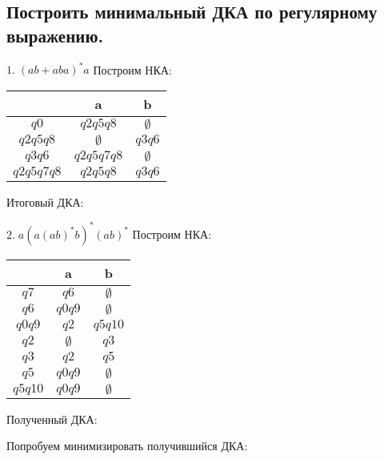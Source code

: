 \documentclass[a4paper,12pt]{article}
\begin{document}
\subsection*{Построить минимальный ДКА по регулярному выражению.}
\Large $1.\;(ab+aba)^*a$\newline
Построим НКА:
\begin{center}
\newline
\end{center}
\begin{center}
\begin{tabular}{ |c|c|c| } 
\hline
  & a & b \\ [0.5ex] 
 \hline
$q0$ & $q2q5q8$ & $\emptyset$ \\
$q2q5q8$ & $\emptyset$ & $q3q6$ \\
$q3q6$ & $q2q5q7q8$ & $\emptyset$ \\
$q2q5q7q8$ & $q2q5q8$ & $q3q6$ \\
 \hline
\end{tabular}
\end{center}
Итоговый ДКА:
\begin{center}
\newline
\end{center}
\Large $2.\;a(a(ab)^*b)^*(ab)^*$\newline
Построим НКА:
\begin{center}
\newline
\end{center}
\begin{center}
\begin{tabular}{ |c|c|c| } 
\hline
  & a & b \\ [0.5ex] 
 \hline
$q7$ & $q6$ & $\emptyset$ \\
$q6$ & $q0q9$ & $\emptyset$ \\
$q0q9$ & $q2$ & $q5q10$ \\
$q2$ & $\emptyset$ & $q3$ \\
$q3$ & $q2$ & $q5$ \\
$q5$ & $q0q9$ & $\emptyset$ \\
$q5q10$ & $q0q9$ & $\emptyset$ \\
 \hline
\end{tabular}
\end{center}
Полученный ДКА:
\begin{center}
\newline
\end{center}
Попробуем минимизировать получившийся ДКА:\newline
\end{document}
